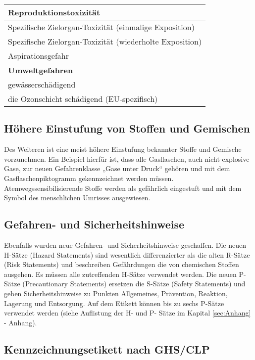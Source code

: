 \begin{table}[H]
\centering
\begin{tabu} to 1.0\textwidth { | X[l] | } \hline
    Reproduktionstoxizität \\ \hline
    Spezifische Zielorgan-Toxizität (einmalige Exposition) \\ \hline
    Spezifische Zielorgan-Toxizität (wiederholte Exposition) \\ \hline
    Aspirationsgefahr \\ \hline
  \textbf{Umweltgefahren} \\ \hline
    gewässerschädigend \\ \hline
    die Ozonschicht schädigend (EU-spezifisch) \\ \hline
\end{tabu}
\end{table}

\subsection{Höhere Einstufung von Stoffen und Gemischen}

Des Weiteren ist eine meist höhere Einstufung bekannter Stoffe und Gemische 
vorzunehmen. Ein Beispiel hierfür ist, dass alle Gasflaschen, auch nicht-explosive 
Gase, zur neuen Gefahrenklasse „Gase unter Druck“ gehören und mit dem 
Gasflaschenpiktogramm gekennzeichnet werden müssen. Atemwegssensibilisierende 
Stoffe werden als gefährlich eingestuft und mit dem Symbol des menschlichen 
Umrisses ausgewiesen. \cite{dguv}

\subsection{Gefahren- und Sicherheitshinweise}

Ebenfalls wurden neue Gefahren- und Sicherheitshinweise geschaffen. Die neuen 
H-Sätze (Hazard Statements) sind wesentlich differenzierter als die alten R-Sätze 
(Risk Statements) und beschreiben Gefährdungen die von chemischen Stoffen 
ausgehen. Es müssen alle zutreffenden H-Sätze verwendet werden. Die neuen P-Sätze 
(Precautionary Statements) ersetzen die S-Sätze (Safety Statements) und geben 
Sicherheitshinweise zu Punkten Allgemeines, Prävention, Reaktion, Lagerung und 
Entsorgung. Auf dem Etikett können bis zu sechs P-Sätze verwendet werden (siehe 
Auflistung der H- und P- Sätze im Kapital \ref{sec:Anhang} - Anhang). \cite{dguv}

\subsection{Kennzeichnungsetikett nach GHS/CLP}

